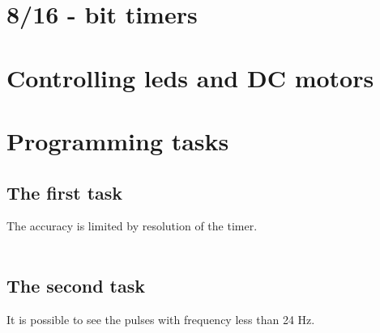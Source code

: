 \documentclass[english]{article}
\begin{document}
\section{8/16 - bit timers}

\section{Controlling leds and DC motors}

\section{Programming tasks}

\subsection{The first task}


The accuracy is limited by resolution of the timer.\\\\
\subsection{The second task}


It is possible to see the pulses with frequency less than 24 Hz.
\end{document}

